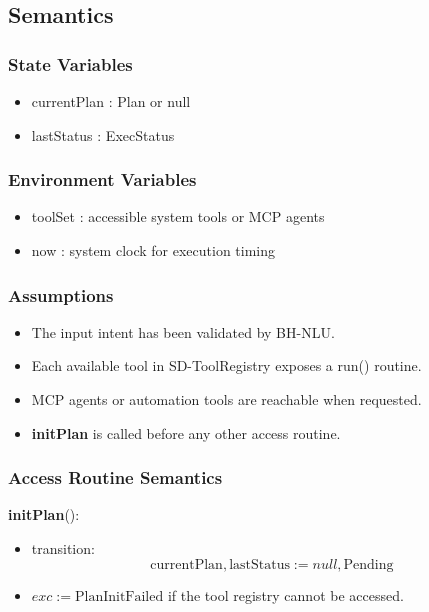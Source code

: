 \documentclass[12pt, titlepage]{article}
\begin{document}
\subsection{Semantics}

\subsubsection{State Variables}

\begin{itemize}
  \item currentPlan : Plan or null
  \item lastStatus : ExecStatus
\end{itemize}

\subsubsection{Environment Variables}

\begin{itemize}
  \item toolSet : accessible system tools or MCP agents
  \item now : system clock for execution timing
\end{itemize}

\subsubsection{Assumptions}

\begin{itemize}
  \item The input intent has been validated by BH-NLU.
  \item Each available tool in SD-ToolRegistry exposes a run() routine.
  \item MCP agents or automation tools are reachable when requested.
  \item \textbf{initPlan} is called before any other access routine.
\end{itemize}

\subsubsection{Access Routine Semantics}

\noindent
\textbf{initPlan}():
\begin{itemize}
  \item transition:
  \[
    \text{currentPlan}, \text{lastStatus} := null, \text{Pending}
  \]
  \item $exc := \text{PlanInitFailed}$ if the tool registry cannot be accessed.
\end{itemize}
\end{document}
